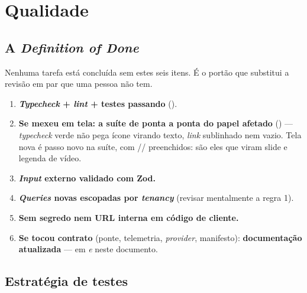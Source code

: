 \chapter{Qualidade}
\label{cap:qualidade}

\section{A \emph{Definition of Done}}

\begin{regra}
Nenhuma tarefa está concluída sem estes seis itens. É o portão que substitui a
revisão em par que uma pessoa não tem.

\begin{enumerate}
  \item \textbf{\emph{Typecheck} + \emph{lint} + testes passando}
    ().
  \item \textbf{Se mexeu em tela: a suíte de ponta a ponta do papel afetado}
    () --- \emph{typecheck} verde não pega
    ícone virando texto, \emph{link} sublinhado nem  vazio. Tela nova
    é passo novo na suíte, com // preenchidos:
    são eles que viram slide e legenda de vídeo.
  \item \textbf{\emph{Input} externo validado com Zod.}
  \item \textbf{\emph{Queries} novas escopadas por \emph{tenancy}} (revisar
    mentalmente a regra 1).
  \item \textbf{Sem segredo nem URL interna em código de cliente.}
  \item \textbf{Se tocou contrato} (ponte, telemetria, \emph{provider},
    manifesto): \textbf{documentação atualizada} --- em  \emph{e}
    neste documento.
\end{enumerate}
\end{regra}

\section{Estratégia de testes}

